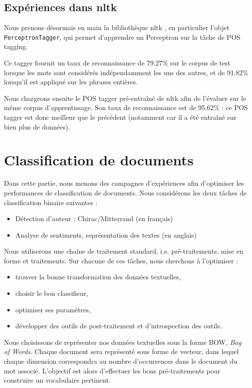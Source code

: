 \documentclass[a4paper]{article}
\begin{document}
\subsection{Expériences dans nltk}

Nous prenons désormais en main la bibliothèque nltk \cite{nltk}, en particulier
l'objet \texttt{PerceptronTagger}, qui permet d'apprendre un Perceptron sur la
tâche de POS tagging.

Ce tagger fournit un taux de reconnaissance de 79.27\% sur le corpus de
test lorsque les mots sont considérés indépendamment les uns des autres, et de
91.82\% lorsqu'il est appliqué sur les phrases entières. 

Nous chargeons ensuite le POS tagger pré-entraîné de nltk afin de l'évaluer sur
le même corpus d'apprentissage. Son taux de reconnaissance est de 95.62\%
: ce POS tagger est donc meilleur que le précédent (notamment car il a été
entraîné sur bien plus de données).


\newpage
\section{Classification de documents}

Dans cette partie, nous menons des campagnes d'expériences afin d'optimiser les
performances de classification de documents. Nous considérons les deux tâches de
classification binaire suivantes :
\begin{itemize}
    \item Détection d'auteur : Chirac/Mitterrand (en français)
    \item Analyse de sentiments, représentation des textes (en anglais)
\end{itemize}

Nous utiliserons une chaîne de traitement standard, i.e. pré-traitements, mise
en forme et traitements. Sur chacune de ces tâches, nous cherchons à l'optimiser
:

\begin{itemize}
    \item trouver la bonne transformation des données textuelles,
    \item choisir le bon classifieur,
    \item optimiser ses paramètres,
    \item développer des outils de post-traitement et d'introspection des outils.
\end{itemize}

Nous choisissons de représenter nos données textuelles sous la forme BOW,
\emph{Bag of Words}. Chaque document sera représenté sous forme de vecteur, dans
lequel chaque dimension correspondra au nombre d'occurrences dans le document du
mot associé. L'objectif est alors d'effectuer les bons pré-traitements pour
construire un vocabulaire pertinent.
\end{document}
